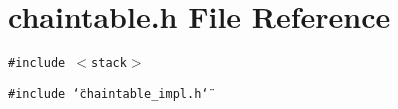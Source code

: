 \section{chaintable.h File Reference}
\label{chaintable_8h}
{\tt \#include $<$stack$>$}\par
{\tt \#include \char`\"{}chaintable\_\-impl.h\char`\"{}}\par
